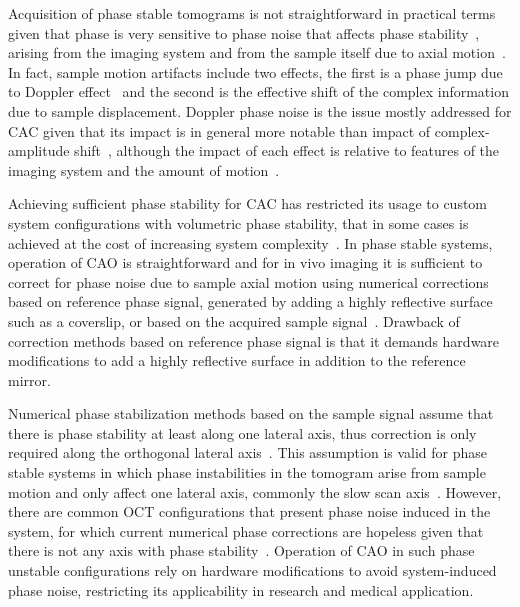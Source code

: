 Acquisition of phase stable tomograms is not straightforward in practical terms given that phase is very sensitive to phase noise that affects phase stability~\cite{Shemonski2014_Stability, Vakoc2005_Phaseresolved}, arising from the imaging system and from the sample itself due to axial motion~\cite{Shemonski2014_Stability-1, Shemonski2014_Threedimensional}. In fact, sample motion artifacts include two effects, the first is a phase jump due to Doppler effect~\cite{Chen1997_Optical, White2003_vivo} and the second is the effective shift of the complex information due to sample displacement. Doppler phase noise is the issue mostly addressed for CAC given that its impact is in general more notable than impact of complex-amplitude shift~\cite{Shemonski2014_Stability-1, Shemonski2014_Threedimensional}, although the impact of each effect is relative to features of the imaging system and the amount of motion~\cite{Shemonski2014_Stability}.

Achieving sufficient phase stability for CAC has restricted its usage to custom system configurations with volumetric phase stability, that in some cases is achieved at the cost of increasing system complexity~\cite{Ginner2018_Holographic, Kumar2013_Subaperture, Hillmann2016_Aberrationfree, Sudkamp2018_Simple}. In phase stable systems, operation of CAO is straightforward and for in vivo imaging it is sufficient to correct for phase noise due to sample axial motion using numerical corrections based on reference phase signal, generated by adding a highly reflective surface such as a coverslip, or based on the acquired sample signal~\cite{White2003_vivo, Ralston2006_Phase}. Drawback of correction methods based on reference phase signal is that it demands hardware modifications to add a highly reflective surface in addition to the reference mirror.

Numerical phase stabilization methods based on the sample signal assume that there is phase stability at least along one lateral axis, thus correction is only required along the orthogonal lateral axis~\cite{Shemonski2014_Threedimensional}. This assumption is valid for phase stable systems in which phase instabilities in the tomogram arise from sample motion and only affect one lateral axis, commonly the slow scan axis~\cite{Shemonski2014_Threedimensional}. However, there are common OCT configurations that present phase noise induced in the system, for which current numerical phase corrections are hopeless given that there is not any axis with phase stability~\cite{Vakoc2005_Phaseresolved}. Operation of CAO in such phase unstable configurations rely on hardware modifications to avoid system-induced phase noise, restricting its applicability in research and medical application.

